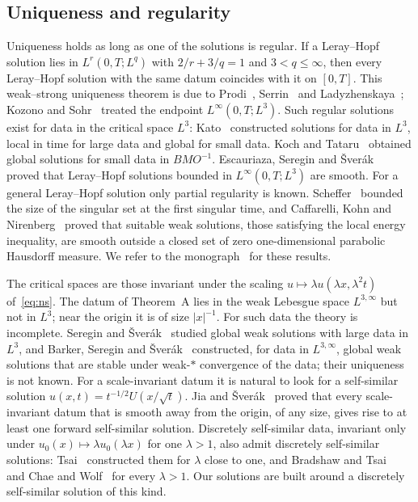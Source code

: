 \documentclass[11pt]{article}
\numberwithin{equation}{section}
\theoremstyle{definition}
\theoremstyle{remark}
\theoremstyle{plain}
\begin{document}
\subsection{Uniqueness and regularity}
\label{sec:intro-uniqueness}

Uniqueness holds as long as one of the solutions is regular. If a
Leray--Hopf solution lies in $L^r(0,T;L^q)$ with $2/r+3/q=1$ and
$3<q\le\infty$, then every Leray--Hopf solution with the same datum
coincides with it on $[0,T]$. This weak--strong uniqueness theorem is due
to Prodi~\cite{prodi1959}, Serrin~\cite{serrin1963} and
Ladyzhenskaya~\cite{ladyzhenskaya1967}; Kozono and
Sohr~\cite{kozono-sohr1996} treated the endpoint $L^\infty(0,T;L^3)$.
Such regular solutions exist for data in the critical space $L^3$:
Kato~\cite{kato1984} constructed solutions for data in $L^3$, local in
time for large data and global for small data. Koch and Tataru~\cite{koch-tataru2001} obtained global
solutions for small data in $BMO^{-1}$. Escauriaza, Seregin and
\v Sver\'ak~\cite{ess2003} proved that Leray--Hopf solutions bounded in
$L^\infty(0,T;L^3)$ are smooth. For a general Leray--Hopf solution only
partial regularity is known. Scheffer~\cite{scheffer1976} bounded the
size of the singular set at the first singular time, and Caffarelli, Kohn
and Nirenberg~\cite{ckn1982} proved that suitable weak solutions, those
satisfying the local energy inequality, are smooth outside a closed set of
zero one-dimensional parabolic Hausdorff measure.
We refer to the monograph~\cite{lemarie2016} for these results.

The critical spaces are those invariant under the scaling
$u\mapsto\lambda u(\lambda x,\lambda^2t)$ of~\eqref{eq:ns}. The datum of
Theorem~A lies in the weak Lebesgue space $L^{3,\infty}$ but not in
$L^3$; near the origin it is of size $|x|^{-1}$. For such data the theory
is incomplete. Seregin and \v Sver\'ak~\cite{seregin-sverak2017}
studied global weak solutions with large data in $L^3$, and Barker,
Seregin and \v Sver\'ak~\cite{bss2018} constructed, for data in
$L^{3,\infty}$, global weak solutions that are stable under weak-$*$
convergence of the data; their uniqueness is not known.
For a scale-invariant datum it is natural to look for a self-similar
solution $u(x,t)=t^{-1/2}U(x/\sqrt t)$. Jia and \v Sver\'ak~\cite{jia-sverak2014} proved
that every scale-invariant datum that is smooth away from the origin,
of any size, gives rise to at least one forward self-similar solution.
Discretely self-similar data, invariant only under
$u_0(x)\mapsto\lambda u_0(\lambda x)$ for one $\lambda>1$, also admit
discretely self-similar solutions: Tsai~\cite{tsai2014} constructed them
for $\lambda$ close to one, and Bradshaw and Tsai~\cite{bradshaw-tsai2017}
and Chae and Wolf~\cite{chae-wolf2018} for every $\lambda>1$. Our solutions are built around a
discretely self-similar solution of this kind.
\end{document}
